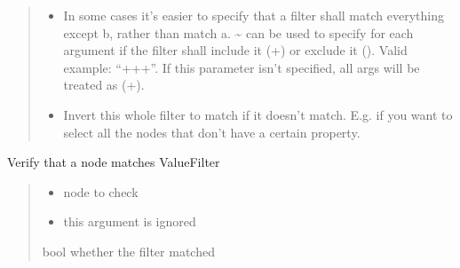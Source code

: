 \documentclass[a4paper,10pt,english]{sphinxmanual}
\begin{document}
\begin{fulllineitems}
\begin{fulllineitems}
\begin{quote}
\begin{description}
\begin{itemize}
\item {}
\sphinxAtStartPar
{} \textendash{} In some cases it’s easier to specify that a filter shall match everything except b, rather than
match a. \textasciitilde{} can be used to specify for each argument if the filter shall include it (+) or exclude it
(\sphinxhyphen{}). Valid example: “++\sphinxhyphen{}+”. If this parameter isn’t specified, all args will be treated as (+).

\item {}
\sphinxAtStartPar
{} \textendash{} Invert this whole filter to match if it doesn’t match. E.g. if you want to select all the nodes
that don’t have a certain property.

\end{itemize}

\end{description}\end{quote}

\end{fulllineitems}


\begin{fulllineitems}
\label{\detokenize{fagus.filters:fagus.filters.VFil.match_node}}
\pysigstartsignatures
{}
\pysigstopsignatures
\sphinxAtStartPar
Verify that a node matches ValueFilter
\begin{quote}\begin{description}
\begin{itemize}
\item {}
\sphinxAtStartPar
{} \textendash{} node to check

\item {}
\sphinxAtStartPar
\sphinxstyleliteralstrong{\sphinxupquote{\_}} \textendash{} this argument is ignored

\end{itemize}

\sphinxAtStartPar
bool whether the filter matched


\end{description}
\end{quote}
\end{fulllineitems}
\end{fulllineitems}
\end{document}
